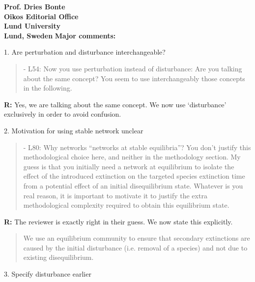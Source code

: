 \documentclass[12pt]{letter}
\begin{document}
\begin{letter}{\bf Prof. Dries Bonte\\
Oikos Editorial Office \\
Lund University \\
Lund, Sweden}
  \textbf{Major comments:}

    1. Are perturbation and disturbance interchangeable?

    \begin{quotation}
      - L54: Now you use perturbation instead of disturbance: Are you talking about the same concept? You seem to use interchangeably those concepts in the following.
    \end{quotation}

      \textbf{R:} Yes, we are talking about the same concept. We now use `disturbance' exclusively in order to avoid confusion.


    2. Motivation for using stable network unclear

    \begin{quotation}
      - L80: Why networks ``networks at stable equilibria''? You don’t justify this methodological choice here, and neither in the methodology section. My guess is that you initially need a network at equilibrium to isolate the effect of the introduced extinction on the targeted species extinction time from a potential effect of an initial disequilibrium state. Whatever is you real reason, it is important to motivate it to justify the extra methodological complexity  required to obtain this equilibrium state.
    \end{quotation}

      \textbf{R:}
      The reviewer is exactly right in their guess. We now state this explicitly.
      
      \begin{quotation}
          We use an equilibrium community to ensure that secondary extinctions are caused by the initial disturbance (i.e. removal of a species) and not due to existing disequilibrium.
      \end{quotation}
      


    3. Specify disturbance earlier


\end{letter}
\end{document}

